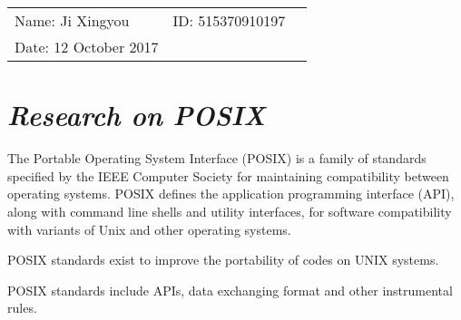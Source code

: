 \documentclass{article}
\begin{document}
\begin{spacing}{2.0}
\vspace*{0.25cm}

\hrulefill

\thispagestyle{empty}

\begin{center}
\begin{large}
\end{large}

\hrulefill

\vspace*{5cm}
\begin{Large}
\end{Large}

\vspace{2em}

\end{center}


\vfill

\begin{table}[h!]
\flushleft
\begin{tabular}{lll}
Name: Ji Xingyou \hspace*{2em}&
ID: 515370910197\hspace*{2em}
\\

Date: 12 October 2017

\end{tabular}
\end{table}

\hfill

\newpage
\section{\textit{Research on POSIX}}
\indent The Portable Operating System Interface (POSIX) is a family of standards specified by the IEEE Computer Society for maintaining compatibility between operating systems. POSIX defines the application programming interface (API), along with command line shells and utility interfaces, for software compatibility with variants of Unix and other operating systems.

POSIX standards exist to improve the portability of codes on UNIX systems.

POSIX standards include APIs, data exchanging format and other instrumental rules.

\end{spacing}
\end{document}
